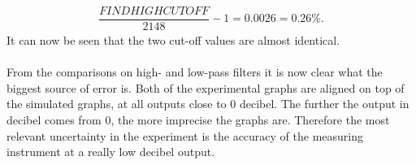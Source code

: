 \begin{align}
\dfrac{FIND HIGH CUTOFF}{2148}-1= 0.0026 = 0.26 \%.
\end{align}
It can now be seen that the two cut-off values are almost identical.
\\ \\
From the comparisons on high- and low-pass filters it is now clear what the biggest source of error is. Both of the experimental graphs are aligned on top of the simulated graphs, at all outputs close to 0 decibel. The further the output in decibel comes from 0, the more imprecise the graphs are. Therefore the most relevant uncertainty in the experiment is the accuracy of the measuring instrument at a really low decibel output.